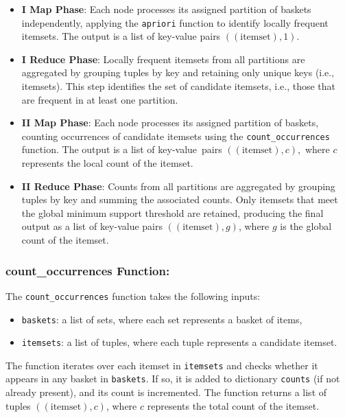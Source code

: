 \documentclass{Class/julia}
\begin{document}
\begin{itemize}
    \item \textbf{I Map Phase}: Each node processes its assigned partition of baskets independently, applying the \texttt{apriori} function to identify locally frequent itemsets. The output is a list of key-value pairs \(((\text{itemset}), 1)\).

    \item \textbf{I Reduce Phase}: Locally frequent itemsets from all partitions are aggregated by grouping tuples by key and retaining only unique keys (i.e., itemsets). This step identifies the set of candidate itemsets, i.e., those that are frequent in at least one partition.

    \item \textbf{II Map Phase}: Each node processes its assigned partition of baskets, counting occurrences of candidate itemsets using the \texttt{count\_occurrences} function. The output is a list of key-value~pairs \(((\text{itemset}), c)\),~where \( c \) represents the local count of the itemset.

    \item \textbf{II Reduce Phase}: Counts from all partitions are aggregated by grouping tuples by key and summing the associated counts. Only itemsets that meet the global minimum support threshold are retained, producing the final output as a list of key-value pairs \(((\text{itemset}), g)\), where \( g \) is the global count of the itemset.
\end{itemize}

\subsubsection*{count\_occurrences Function:}

The \texttt{count\_occurrences} function takes the following inputs:

\begin{itemize}
\item \texttt{baskets}: a list of sets, where each set represents a basket of items,
\item \texttt{itemsets}: a list of tuples, where each tuple represents a candidate itemset.
\end{itemize}

The function iterates over each itemset in \texttt{itemsets} and checks whether it appears in any basket in \texttt{baskets}. If so, it is added to dictionary \texttt{counts} (if not already present), and its count is incremented. The function returns a list of tuples \(((\text{itemset}), c)\), where \( c \) represents the total count of the itemset.
\end{document}
